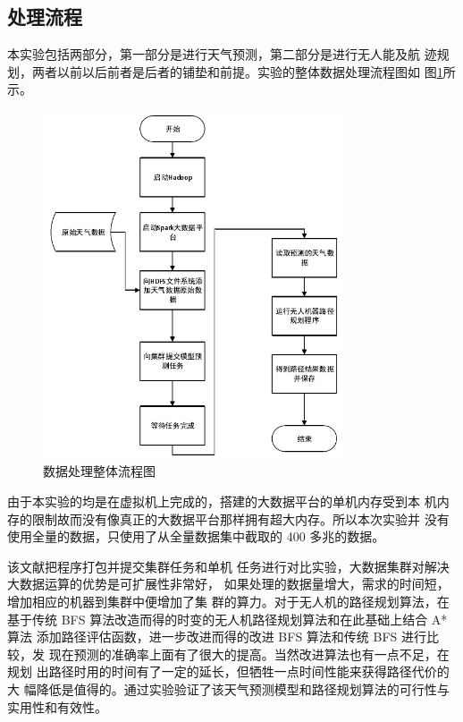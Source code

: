 \documentclass[UTF8,a4paper,10pt,nocolorlinks]{ctexart}
\begin{document}
\subsection{处理流程}
本实验包括两部分，第一部分是进行天气预测，第二部分是进行无人能及航
迹规划，两者以前以后前者是后者的铺垫和前提。实验的整体数据处理流程图如
图\ref{flow}所示。 
\begin{figure}[h]
  \centering %
  \includegraphics[width=0.8\textwidth]{DataFlow.png} %
  \caption{数据处理整体流程图}
  \label{flow}
\end{figure}
\par 由于本实验的均是在虚拟机上完成的，搭建的大数据平台的单机内存受到本
机内存的限制故而没有像真正的大数据平台那样拥有超大内存。所以本次实验并
没有使用全量的数据，只使用了从全量数据集中截取的 400 多兆的数据。

该文献把程序打包并提交集群任务和单机
任务进行对比实验，大数据集群对解决大数据运算的优势是可扩展性非常好，
如果处理的数据量增大，需求的时间短，增加相应的机器到集群中便增加了集
群的算力。对于无人机的路径规划算法，在基于传统 BFS 算法改造而得的时变的无人机路径规划算法和在此基础上结合 A*算法
添加路径评估函数，进一步改进而得的改进 BFS 算法和传统 BFS 进行比较，发
现在预测的准确率上面有了很大的提高。当然改进算法也有一点不足，在规划
出路径时用的时间有了一定的延长，但牺牲一点时间性能来获得路径代价的大
幅降低是值得的。通过实验验证了该天气预测模型和路径规划算法的可行性与
实用性和有效性。
\end{document}

